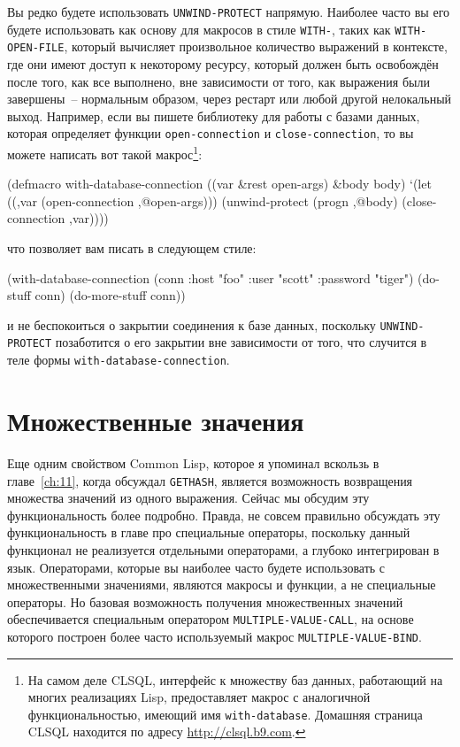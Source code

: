 Вы редко будете использовать \lstinline{UNWIND-PROTECT} напрямую.  Наиболее часто вы его
будете использовать как основу для макросов в стиле \lstinline{WITH-}, таких как
\lstinline{WITH-OPEN-FILE}, который вычисляет произвольное количество выражений в контексте,
где они имеют доступ к некоторому ресурсу, который должен быть освобождён после того, как
все выполнено, вне зависимости от того, как выражения были завершены~-- нормальным
образом, через рестарт или любой другой нелокальный выход.  Например, если вы пишете
библиотеку для работы с базами данных, которая определяет функции \lstinline{open-connection} и
\lstinline{close-connection}, то вы можете написать вот такой макрос\footnote{На самом
  деле CLSQL, интерфейс к множеству баз данных, работающий на многих реализациях Lisp,
  предоставляет макрос с аналогичной функциональностью, имеющий имя \lstinline{with-database}.
  Домашняя страница CLSQL находится по адресу \url{http://clsql.b9.com}.}:

\begin{myverb}
(defmacro with-database-connection ((var &rest open-args) &body body)
  `(let ((,var (open-connection ,@open-args)))
    (unwind-protect (progn ,@body)
      (close-connection ,var))))
\end{myverb}

\noindent{}что позволяет вам писать в следующем стиле:

\begin{myverb}
(with-database-connection (conn :host "foo" :user "scott" :password "tiger")
  (do-stuff conn)
  (do-more-stuff conn))
\end{myverb}

и не беспокоиться о закрытии соединения к базе данных, поскольку \lstinline{UNWIND-PROTECT}
позаботится о его закрытии вне зависимости от того, что случится в теле формы
\lstinline{with-database-connection}.

\section{Множественные значения}

Еще одним свойством Common Lisp, которое я упоминал вскользь в главе~\ref{ch:11}, когда
обсуждал \lstinline{GETHASH}, является возможность возвращения множества значений из одного
выражения. Сейчас мы обсудим эту функциональность более подробно. Правда, не совсем
правильно обсуждать эту функциональность в главе про специальные операторы, поскольку данный
функционал не реализуется отдельными операторами, а глубоко интегрирован в
язык. Операторами, которые вы наиболее часто будете использовать с множественными
значениями, являются макросы и функции, а не специальные операторы.  Но базовая
возможность получения множественных значений обеспечивается специальным оператором
\lstinline{MULTIPLE-VALUE-CALL}, на основе которого построен более часто используемый макрос
\lstinline{MULTIPLE-VALUE-BIND}.

